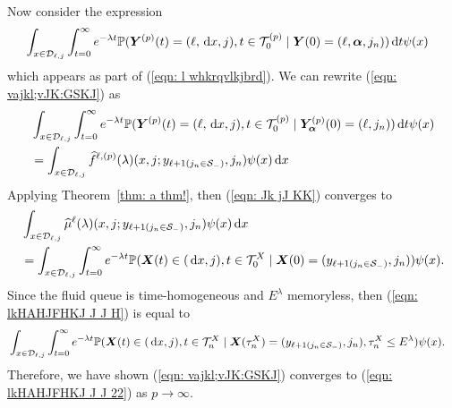 Now consider the expression 
\begin{align}
	&\int_{x\in\mathcal{D}_{\ell,j}} \int_{t=0}^\infty e^{-\lambda t} \mathbb P({\boldsymbol Y}^{(p)}(t) = (\ell,\, \mathrm{d} x, j),  
	t\in\mathcal T_0^{(p)} \mid \boldsymbol Y(0) = (\ell,\boldsymbol\alpha, j_n)
	 	 )\, \mathrm{d} t  \psi(x)  \label{eqn: vajkl;vJK:GSKJ}
\end{align}
which appears as part of (\ref{eqn: l whkrqvlkjbrd}). We can rewrite (\ref{eqn: vajkl;vJK:GSKJ}) as  
\begin{align}
	 &\int_{x\in\mathcal{D}_{\ell,j}} \int_{t=0}^\infty e^{-\lambda t} \mathbb P({\boldsymbol Y}^{(p)}(t) = (\ell,\, \mathrm{d} x,j), 
	t\in\mathcal T_0^{(p)}\mid \bm{Y}_{\bm{\alpha}}^{(p)}(0) = (\ell,j_n))\, \mathrm{d} t \psi(x) \nonumber 
	 \\&= \int_{x\in\mathcal{D}_{\ell,j}} \widehat f^{\ell,(p)} (\lambda)(x,j;y_{\ell+1(j_n\in\mathcal S_-)},j_n) \psi(x)\, \mathrm{d} x \label{eqn: Jk jJ KK}
\end{align}
Applying Theorem~\ref{thm: a thm!}, then (\ref{eqn: Jk jJ KK}) converges to 
\begin{align}
	&\int_{x\in\mathcal{D}_{\ell,j}} \widehat \mu^{\ell} (\lambda)(x,j;y_{\ell+1(j_n\in\mathcal S_-)},j_n) \psi(x)\, \mathrm{d} x \nonumber 
	\\&= \int_{x\in\mathcal{D}_{\ell,j}} \int_{t=0}^\infty e^{-\lambda t}\mathbb P(\boldsymbol X(t)\in(\, \mathrm{d} x, j), t\in\mathcal T_0^X \mid \boldsymbol X(0) = (y_{\ell+1(j_n\in\mathcal S_-)}, j_n) ) \psi(x). \label{eqn: lkHAHJFHKJ J J H}
\end{align}
Since the fluid queue is time-homogeneous and \(E^\lambda\) memoryless, then (\ref{eqn: lkHAHJFHKJ J J H}) is equal to 
\begin{align}
	&\int_{x\in\mathcal{D}_{\ell,j}} \int_{t=0}^\infty e^{-\lambda t} \mathbb P(\boldsymbol X(t)\in(\, \mathrm{d} x,j), t\in\mathcal T_n^{X} \mid  
	\boldsymbol X(\tau_n^X) = (y_{\ell+1(j_n\in\mathcal S_-)},j_n), \tau_n^X\leq E^\lambda ) \psi(x).  \label{eqn: lkHAHJFHKJ J J 22}
\end{align}
Therefore, we have shown (\ref{eqn: vajkl;vJK:GSKJ}) converges to (\ref{eqn: lkHAHJFHKJ J J 22}) as \(p\to\infty\). 

